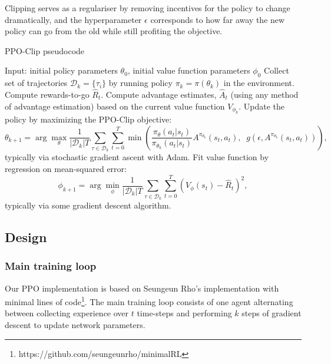 \documentclass[12pt,a4paper]{article}
\begin{document}
Clipping serves as a regulariser by removing incentives for the policy to change dramatically, and the hyperparameter \(\epsilon\) corresponds to how far away the new policy can go from the old while still profiting the objective. 

\begin{algorithm}[H]
    \caption{PPO-Clip pseudocode}
    \label{alg1}
\begin{algorithmic}[1]
    \STATE Input: initial policy parameters $\theta_0$, initial value function parameters $\phi_0$
    \STATE Collect set of trajectories ${\mathcal D}_k = \{\tau_i\}$ by running policy $\pi_k = \pi(\theta_k)$ in the environment.
    \STATE Compute rewards-to-go $\hat{R}_t$.
    \STATE Compute advantage estimates, $\hat{A}_t$ (using any method of advantage estimation) based on the current value function $V_{\phi_k}$.
    \STATE Update the policy by maximizing the PPO-Clip objective:
        \begin{equation*}
        \theta_{k+1} = \arg \max_{\theta} \frac{1}{|{\mathcal D}_k| T} \sum_{\tau \in {\mathcal D}_k} \sum_{t=0}^T \min\left(
            \frac{\pi_{\theta}(a_t|s_t)}{\pi_{\theta_k}(a_t|s_t)}  A^{\pi_{\theta_k}}(s_t,a_t), \;\;
            g(\epsilon, A^{\pi_{\theta_k}}(s_t,a_t))
        \right),
        \end{equation*}
        typically via stochastic gradient ascent with Adam.
    \STATE Fit value function by regression on mean-squared error:
        \begin{equation*}
        \phi_{k+1} = \arg \min_{\phi} \frac{1}{|{\mathcal D}_k| T} \sum_{\tau \in {\mathcal D}_k} \sum_{t=0}^T\left( V_{\phi} (s_t) - \hat{R}_t \right)^2,
        \end{equation*}
        typically via some gradient descent algorithm.
    \ENDFOR
\end{algorithmic}
\end{algorithm}

\subsection{Design}
\subsubsection{Main training loop}
Our PPO implementation is based on Seungeun Rho's implementation with minimal lines of code\footnote{https://github.com/seungeunrho/minimalRL}. The main training loop consists of one agent alternating between collecting experience over $t$ time-steps and performing $k$ steps of gradient descent to update network parameters. 
\end{document}
